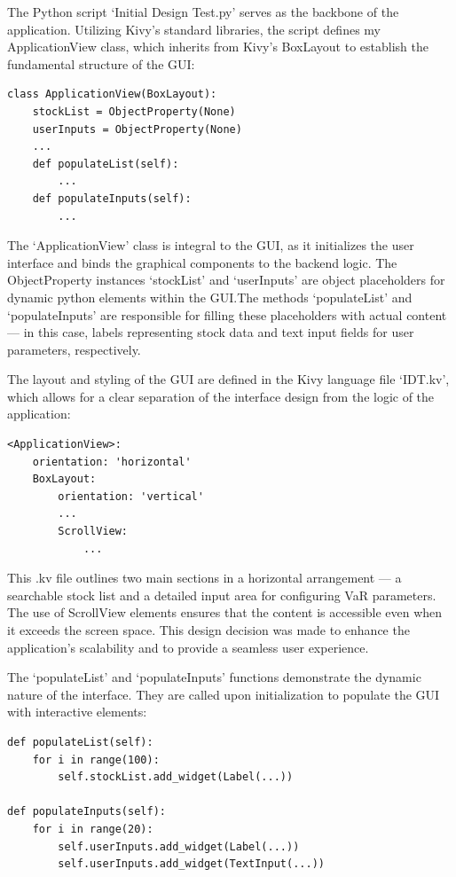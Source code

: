 \documentclass{article}
\begin{document}
The Python script `Initial Design Test.py' serves as the backbone of the application. Utilizing Kivy's standard libraries, the script defines my ApplicationView class, which inherits from Kivy's BoxLayout to establish the fundamental structure of the GUI:

\begin{verbatim}
class ApplicationView(BoxLayout):
    stockList = ObjectProperty(None)
    userInputs = ObjectProperty(None)
    ...
    def populateList(self):
        ...
    def populateInputs(self):
        ...
\end{verbatim}

The `ApplicationView' class is integral to the GUI, as it initializes the user interface and binds the graphical components to the backend logic. The ObjectProperty instances `stockList' and `userInputs' are object placeholders for dynamic python elements within the GUI.\@ The methods `populateList' and `populateInputs' are responsible for filling these placeholders with actual content — in this case, labels representing stock data and text input fields for user parameters, respectively.\\\vspace{0.3cm}

The layout and styling of the GUI are defined in the Kivy language file `IDT.kv', which allows for a clear separation of the interface design from the logic of the application:

\begin{verbatim}
<ApplicationView>:
    orientation: 'horizontal'
    BoxLayout:
        orientation: 'vertical'
        ...
        ScrollView:
            ...
\end{verbatim}

This .kv file outlines two main sections in a horizontal arrangement — a searchable stock list and a detailed input area for configuring VaR parameters. The use of ScrollView elements ensures that the content is accessible even when it exceeds the screen space. This design decision was made to enhance the application's scalability and to provide a seamless user experience.\\\vspace{0.3cm}

The `populateList' and `populateInputs' functions demonstrate the dynamic nature of the interface. They are called upon initialization to populate the GUI with interactive elements:

\begin{verbatim}
def populateList(self):
    for i in range(100):
        self.stockList.add_widget(Label(...))
        
def populateInputs(self):
    for i in range(20):
        self.userInputs.add_widget(Label(...))
        self.userInputs.add_widget(TextInput(...))
\end{verbatim}
\end{document}
